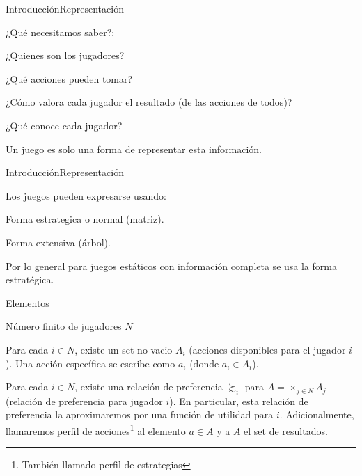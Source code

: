 \documentclass[notes, 11pt]{beamer} %
\newenvironment{wideitemize}{\itemize\addtolength{\itemsep}{10pt}}{\enditemize}
\begin{document}
\begin{frame}{Introducci\'on}{Representaci\'on}
	\begin{wideitemize}
		\item<1-> ¿Qu\'e necesitamos saber?:
		\begin{wideitemize}
			\item<2->[--] ¿Quienes son los jugadores?
			\item<3->[--] ¿Qu\'e acciones pueden tomar?
			\item<4->[--] ¿C\'omo valora cada jugador el resultado (de las acciones de todos)?
			\item<5->[--] ¿Qu\'e conoce cada jugador?
		\end{wideitemize}
		\item<6-> Un juego es solo una forma de representar esta informaci\'on.
	\end{wideitemize}
\end{frame}

\begin{frame}{Introducci\'on}{Representaci\'on}
	\begin{wideitemize}
		\item<1-> Los juegos pueden expresarse usando:
		\begin{wideitemize}
			\item<2->[--] Forma estrategica o normal (matriz).
			\item<3->[--] Forma extensiva (\'arbol).
		\end{wideitemize}

		\item<4-> Por lo general para juegos est\'aticos con informaci\'on completa se usa la forma estrat\'egica.
	\end{wideitemize}
\end{frame}

\begin{frame}{Elementos}
		\begin{wideitemize}
			\item<1-> N\'umero finito de jugadores $N$
			\item<2-> Para cada $i \in N$, existe un set no vacio $A_{i}$ (acciones disponibles para el jugador $i$). Una acci\'on espec\'ifica se escribe como $a_{i}$ (donde $a_{i} \in A_{i}$).
			\item<3-> Para cada $i \in N$, existe una relaci\'on de preferencia $\succsim_{i}$ para $A = \times_{j \in N} A_{j}$ (relaci\'on de preferencia para jugador $i$). En particular, esta relaci\'on de preferencia la aproximaremos por una funci\'on de utilidad para $i$. Adicionalmente, llamaremos perfil de acciones\footnote{Tambi\'en llamado perfil de estrategias} al elemento $a \in A$ y a $A$ el set de resultados.
		\end{wideitemize}
\end{frame}
\end{document}
